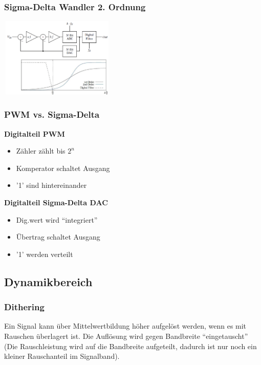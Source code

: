\begin{multicols}{3}
  \subsubsection{Sigma-Delta Wandler 2. Ordnung}
    \includegraphics[width=5.5cm, height =3.8cm]{pictures/deltaSigma2}
  
  \columnbreak
  
  \subsubsection{PWM vs. Sigma-Delta}
      \textbf{Digitalteil PWM}
      \begin{itemize}
        \item Zähler zählt bis $2^n$
        \item Komperator schaltet Ausgang
        \item '1' sind hintereinander
      \end{itemize}
      
      \textbf{Digitalteil Sigma-Delta DAC}
      \begin{itemize}
        \item Dig.wert wird "`integriert"'
        \item Übertrag schaltet Ausgang
        \item '1' werden verteilt
      \end{itemize}
      \columnbreak
      \subsection{Dynamikbereich}
\subsubsection{Dithering}
  Ein Signal kann über Mittelwertbildung höher aufgelöst werden, wenn es mit Rauschen überlagert ist.
  Die Auflösung wird gegen Bandbreite "`eingetauscht"' (Die Rauschleistung wird auf die Bandbreite aufgeteilt,
  dadurch ist nur noch ein kleiner Rauschanteil im Signalband).
  

\end{multicols}
